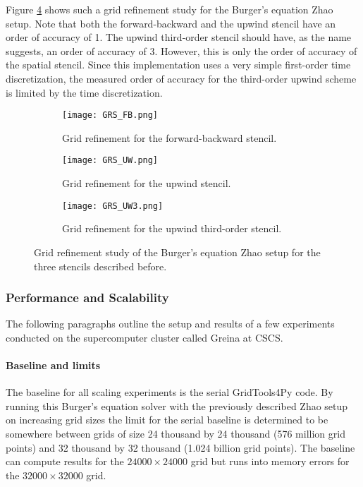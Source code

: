 Figure \ref{fig:grs} shows such a grid refinement study for the Burger's equation Zhao setup.
Note that both the forward-backward and the upwind stencil have an order of accuracy of 1.
The upwind third-order stencil should have, as the name suggests, an order of accuracy of 3.
However, this is only the order of accuracy of the spatial stencil.
Since this implementation uses a very simple first-order time discretization, the measured order of accuracy for the third-order upwind scheme is limited by the time discretization.

\begin{figure}[!htbp]
\centering
\begin{subfigure}{0.8\textwidth}
  \centering
  \texttt{[image: GRS\_FB.png]}
  \caption{Grid refinement for the forward-backward stencil.}
  \label{fig:grs_1}
\end{subfigure}

\begin{subfigure}{0.8\textwidth}
  \centering
  \texttt{[image: GRS\_UW.png]}
  \caption{Grid refinement for the upwind stencil.}
  \label{fig:grs_2}
\end{subfigure}

\begin{subfigure}{0.8\textwidth}
  \centering
  \texttt{[image: GRS\_UW3.png]}
  \caption{Grid refinement for the upwind third-order stencil.}
  \label{fig:grs_3}
\end{subfigure}
\caption{Grid refinement study of the Burger's equation Zhao setup for the three stencils described before.}
\label{fig:grs}
\end{figure}

\subsubsection{Performance and Scalability}
The following paragraphs outline the setup and results of a few experiments conducted on the supercomputer cluster called Greina at CSCS.

\paragraph{Baseline and limits}
The baseline for all scaling experiments is the serial GridTools4Py code.
By running this Burger's equation solver with the previously described Zhao setup on increasing grid sizes the limit for the serial baseline is determined to be somewhere between grids of size 24 thousand by 24 thousand (576 million grid points) and 32 thousand by 32 thousand (1.024 billion grid points).
The baseline can compute results for the $24000 \times 24000$ grid but runs into memory errors for the $32000 \times 32000$ grid.

